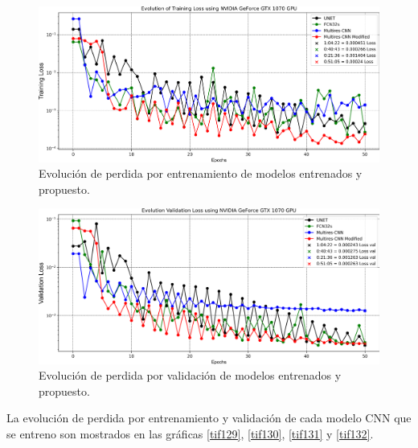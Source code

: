 \documentclass[10pt,letterpaper]{article}
\begin{document}
\begin{figure}[H]
	\centering
    \includegraphics[width=1\textwidth]{tifs/tif127.png}
    \caption{Evolución de perdida por entrenamiento de modelos entrenados y propuesto.}
    \label{tif127}
\end{figure}

\begin{figure}[H]
	\centering
    \includegraphics[width=1\textwidth]{tifs/tif128.png}
    \caption{Evolución de perdida por validación de modelos entrenados y propuesto.}
    \label{tif128}
\end{figure}

La evolución de perdida por entrenamiento y validación de cada modelo CNN que se entreno son mostrados en las gráficas \ref{tif129}, \ref{tif130}, \ref{tif131} y \ref{tif132}.
\end{document}
